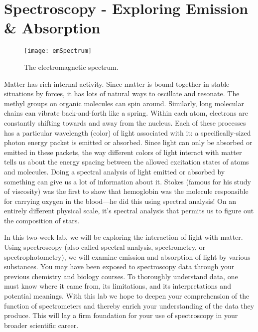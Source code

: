 \chapter{Spectroscopy - Exploring Emission \& Absorption}
\thispagestyle{fancy}
%
\begin{wrapfigure}{R}{0.50\textwidth}
  \vspace{-25pt}  
  \begin{center}
    \texttt{[image: emSpectrum]}
  \end{center}
  \caption{The electromagnetic spectrum.}
  \label{fig:emSpec}
  \vspace{-5pt}
\end{wrapfigure}
Matter has rich internal activity. 
Since matter is bound together in stable situations by forces, it has lots of natural ways to oscillate and resonate. 
The methyl groups on organic molecules can spin around. 
Similarly, long molecular chains can vibrate back-and-forth like a spring. 
Within each atom, electrons are constantly shifting towards and away from the nucleus. 
Each of these processes has a particular wavelength (color) of light associated with it: a specifically-sized photon energy packet is emitted or absorbed. 
Since light can only be absorbed or emitted in these packets, the way different colors of light interact with matter tells us about the energy spacing between the allowed excitation states of atoms and molecules. 
Doing a spectral analysis of light emitted or absorbed by something can give us a lot of information about it. 
Stokes (famous for his study of viscosity) was the first to show that hemoglobin was the molecule responsible for carrying oxygen in the blood—he did this using spectral analysis! 
On an entirely different physical scale, it's spectral analysis that permits us to figure out the composition of stars. 
\par 
In this two-week lab, we will be exploring the interaction of light with matter. 
Using spectroscopy (also called spectral analysis, spectrometry, or spectrophotometry), we will examine emission and absorption of light by various substances. 
You may have been exposed to spectroscopy data through your previous chemistry and biology courses. 
To thoroughly understand data, one must know where it came from, its limitations, and its interpretations and potential meanings. 
With this lab we hope to deepen your comprehension of the function of spectrometers and thereby enrich your understanding of the data they produce. 
This will lay a firm foundation for your use of spectroscopy in your broader scientific career. 

